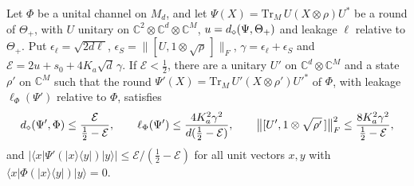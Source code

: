 \begin{lemma}\label{lem:block-extraction}
Let $\Phi$ be a unital channel on $M_d$, and let $\Psi(X)=\mathrm{Tr}_M\,U(X\otimes\rho)U^*$ be a round of $\Theta_+$, with $U$ unitary on
$\mathbb C^2\otimes\mathbb C^d\otimes\mathbb C^M$, $u=d_\diamond(\Psi,\Theta_+)$ and leakage $\ell$ relative to $\Theta_+$. Put
$\epsilon_\ell=\sqrt{2d\ell}$, $\epsilon_S=\|[U,1\otimes\sqrt\rho\,]\|_F$, $\gamma=\epsilon_\ell+\epsilon_S$ and $\mathcal E=2u+s_0+4K_a\sqrt d\,\gamma$. If $\mathcal E<\frac12$,
there are a unitary $U'$ on $\mathbb C^d\otimes\mathbb C^M$ and a state $\rho'$ on $\mathbb C^M$ such that the round
$\Psi'(X)=\mathrm{Tr}_M\,U'(X\otimes\rho')U'^*$ of $\Phi$, with leakage $\ell_\Phi(\Psi')$ relative to $\Phi$, satisfies
\[
d_\diamond(\Psi',\Phi)\le\frac{\mathcal E}{\frac12-\mathcal E},\qquad \ell_\Phi(\Psi')\le\frac{4K_a^2\gamma^2}{d(\frac12-\mathcal E)},\qquad
\bigl\|[U',1\otimes\sqrt{\rho'}\,]\bigr\|_F^2\le\frac{8K_a^2\gamma^2}{\frac12-\mathcal E},
\]
and $|\langle x|\Psi'(|x\rangle\langle y|)|y\rangle|\le \mathcal E/(\frac12-\mathcal E)$ for all unit vectors $x,y$ with $\langle x|\Phi(|x\rangle\langle y|)|y\rangle=0$.
\end{lemma}

